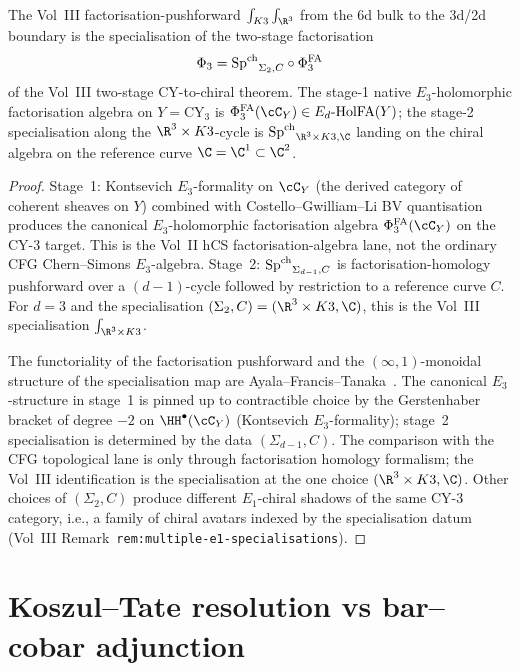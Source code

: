 \begin{theorem}
\label{thm:cfg-row-15}
The Vol~III factorisation-pushforward
$\int_{K3}\int_{\R^3}$ from the 6d bulk to the 3d/2d boundary is the
specialisation of
the two-stage factorisation
\[
\Phi_3 = {\mathrm{Sp}^{\mathrm{ch}}}_{\Sigma_2, C}\circ \Phi^{\mathrm{FA}}_3
\]
of the Vol~III two-stage CY-to-chiral theorem. The stage-1
native $E_3$-holomorphic factorisation algebra on $Y = \mathrm{CY}_3$
is $\PhiFA_3(\cC_Y)\in\EdHolFA(Y)$; the stage-2 specialisation along the
$\R^3\times K3$-cycle is
${\SpCh}_{\R^3\times K3, \C}$ landing on the chiral algebra on the
reference curve $\C = \C^1\subset\C^2$.
\end{theorem}

\begin{proof}
Stage~1: Kontsevich $E_3$-formality on $\cC_Y$ (the derived category
of coherent sheaves on $Y$) combined with Costello--Gwilliam--Li BV
quantisation produces the canonical $E_3$-holomorphic factorisation
algebra $\PhiFA_3(\cC_Y)$ on the CY-$3$ target. This is the Vol~II hCS
factorisation-algebra lane, not the ordinary CFG Chern--Simons
$E_3$-algebra. Stage~2:
${\mathrm{Sp}^{\mathrm{ch}}}_{\Sigma_{d-1}, C}$ is factorisation-homology pushforward over
a $(d-1)$-cycle followed by restriction to a reference curve $C$. For
$d = 3$ and the specialisation $(\Sigma_2, C) = (\R^3\times K3, \C)$,
this is the Vol~III specialisation $\int_{\R^3\times K3}$.

The functoriality of the factorisation pushforward and the
$(\infty,1)$-monoidal structure of the specialisation map are
Ayala--Francis--Tanaka~\cite[Thm.~4.1.3]{AyalaFrancisTanaka2017}. The
canonical $E_3$-structure in stage~1 is pinned up to contractible
choice by the Gerstenhaber bracket of degree $-2$ on $\HH^\bullet(\cC_Y)$
(Kontsevich $E_3$-formality); stage~2 specialisation is determined
by the data $(\Sigma_{d-1}, C)$. The comparison with the CFG
topological lane is only through factorisation homology formalism; the
Vol~III identification is the specialisation at the one choice
$(\R^3\times K3, \C)$. Other choices
of $(\Sigma_2, C)$ produce different $E_1$-chiral shadows of the same
CY-$3$ category, i.e., a family of chiral avatars indexed by the
specialisation datum (Vol~III Remark~\texttt{rem:multiple-e1-specialisations}).
\end{proof}

\section{Koszul--Tate resolution vs bar--cobar adjunction}
\label{sec:cfg-kt-bar-cobar}

